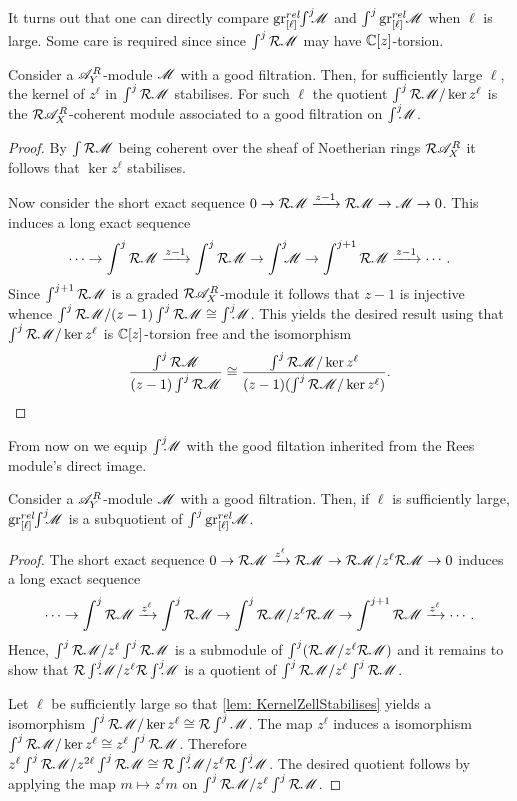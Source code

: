 It turns out that one can directly compare $\operatorname{gr}_{[\ell]}^{rel}\mkern-5mu\int^j \mkern -8mu\mathscr{M}$ and $\int^j \operatorname{gr}_{[\ell]}^{rel}\mkern-5mu\mathscr{M}$ when $\ell$ is large. Some care is required since since $\int^j \mathcal{R} \mathscr{M}$ may have $\mathbb{C}[z]$-torsion.
\begin{lemma}\label{lem: KernelZellStabilises}
  Consider a $\mathscr{A}_Y^R$-module $\mathscr{M}$ with a good filtration. Then, for sufficiently large $\ell$, the kernel of $z^\ell$ in $\int^j \mathcal{R} \mathscr{M}$ stabilises. For such $\ell$ the quotient $\int^j \mathcal{R} \mathscr{M}/ \ker z^\ell$ is the $\mathcal{R} \mathscr{A}_X^R$-coherent module associated to a good filtration on $\int^j \mkern -8mu \mathscr{M}$.
\end{lemma}
\begin{proof}
  By $\int \mathcal{R} \mathscr{M}$ being coherent over the sheaf of Noetherian rings $\mathcal{R}\mathscr{A}_X^R$ it follows that $\ker z^\ell$ stabilises.

    Now consider the short exact sequence $0\to \mathcal{R} \mathscr{M} \xrightarrow{z-1} \mathcal{R} \mathscr{M} \to \mathscr{M} \to 0$. This induces a long exact sequence
    $$\cdots \to \int^j \mathcal{R} \mathscr{M} \xrightarrow{z-1} \int^j \mathcal{R} \mathscr{M} \to \int^j \mkern -8mu \mathscr{M} \to \int^{j+1} \mathcal{R} \mathscr{M} \xrightarrow{z-1}\cdots. $$
    Since $\int^{j+1} \mathcal{R} \mathscr{M}$ is a graded $\mathcal{R}\mathscr{A}_X^R$-module it follows that $z-1$ is injective whence $\int^j \mathcal{R} \mathscr{M} / (z-1)\int^j \mathcal{R} \mathscr{M} \cong \int^j \mkern -8mu \mathscr{M}$. This yields the desired result using that $\int^j \mathcal{R} \mathscr{M} / \ker z^\ell$ is $\mathbb{C}[z]$-torsion free and the isomorphism
    $$ \frac{\int^j \mathcal{R} \mathscr{M} }{(z-1)\int^j \mathcal{R} \mathscr{M} } \cong \frac{\int^j \mathcal{R} \mathscr{M} /\ker z^\ell }{(z-1)(\int^j \mathcal{R} \mathscr{M}/\ker z^\ell) }.$$
\end{proof}
From now on we equip $\int^j \mkern -8mu \mathscr{M}$ with the good filtation inherited from the Rees module's direct image.
\begin{lemma}\label{lem: EllLargeSubquotent}
    Consider a $\mathscr{A}_Y^R$-module $\mathscr{M}$ with a good filtration. Then, if $\ell$ is sufficiently large, $\operatorname{gr}_{[\ell]}^{rel}\mkern-5mu \int^j \mkern -8mu\mathscr{M}$ is a subquotient of $\int^j\operatorname{gr}_{[\ell]}^{rel}\mkern-5mu\mathscr{M}$.
\end{lemma}
\begin{proof}
  The short exact sequence $0\to \mathcal{R}\mathscr{M} \xrightarrow{z^\ell}\mathcal{R} \mathscr{M} \to \mathcal{R}\mathscr{M} / z^\ell \mathcal{R}\mathscr{M} \to 0$ induces a long exact sequence
  $$\cdots \to \int^j \mathcal{R} \mathscr{M} \xrightarrow{z^\ell} \int^j \mathcal{R} \mathscr{M} \to \int^j \mathcal{R}\mathscr{M}/z^\ell \mathcal{R}\mathscr{M} \to \int^{j+1} \mathcal{R} \mathscr{M} \xrightarrow{z^\ell}\cdots. $$
  Hence, $\int^j \mathcal{R} \mathscr{M} / z^\ell \int^j \mathcal{R} \mathscr{M}$ is a submodule of $\int^j (\mathcal{R}\mathscr{M}/z^\ell \mathcal{R}\mathscr{M})$ and it remains to show that $\mathcal{R} \int^j \mkern -8mu \mathscr{M}/ z^\ell \mathcal{R} \int^j \mkern -8mu \mathscr{M}$ is a quotient of $\int^j \mathcal{R} \mathscr{M} / z^\ell \int^j \mathcal{R} \mathscr{M}$.

  Let $\ell$ be sufficiently large so that \cref{lem: KernelZellStabilises} yields a isomorphism $\int^j \mathcal{R} \mathscr{M} / \ker z^\ell \cong \mathcal{R}\int^j \mathscr{M}$. The map $z^\ell$ induces a isomorphism $\int^j \mathcal{R} \mathscr{M} / \ker z^\ell \cong z^\ell \int^j \mathcal{R} \mathscr{M}$. Therefore $z^\ell \int^j \mathcal{R} \mathscr{M} / z^{2\ell}\int^j \mathcal{R}\mathscr{M} \cong \mathcal{R} \int^j \mkern -8mu \mathscr{M} / z^\ell \mathcal{R}\int^j \mkern -8mu \mathscr{M} $.
  The desired quotient follows by applying the map $m\mapsto z^\ell m$ on $\int^j \mathcal{R} \mathscr{M} / z^\ell \int^j \mathcal{R} \mathscr{M}$.
\end{proof}
